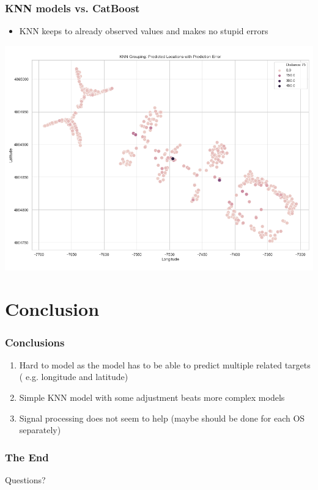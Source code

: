 \documentclass[10pt]{beamer}
\begin{document}
\begin{frame}
\frametitle{KNN models vs. CatBoost}

\begin{itemize}
    \item KNN keeps to already observed values and makes no stupid errors
\end{itemize}

\includegraphics[width=\textwidth,height=\textheight,keepaspectratio]{knn_grouping_error_of_predicted_locations.png}

\end{frame}

\section{Conclusion}

\begin{frame}
\frametitle{Conclusions}

\begin{enumerate}
    \item Hard to model as the model has to be able to predict multiple related targets (
        e.g. longitude and latitude)
    \item Simple KNN model with some adjustment beats more complex models
    \item Signal processing does not seem to help (maybe should be done for each OS separately)
\end{enumerate}

\end{frame}

\begin{frame}
\frametitle{The End}

\LARGE{\centerline{Questions?}}

\end{frame}

\end{document}
